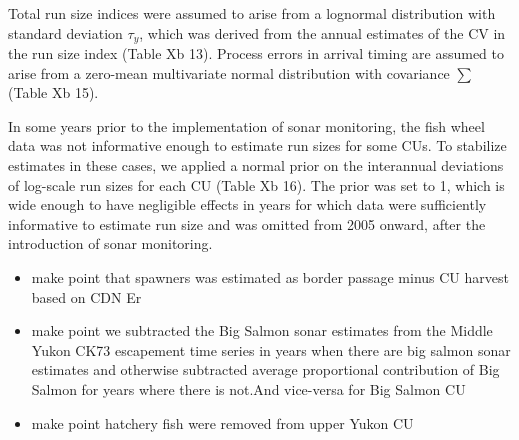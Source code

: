 \documentclass[11pt]{book}
\begin{document}
Total run size indices were assumed to arise from a lognormal distribution with standard deviation \(\tau_y\), which was derived from the annual estimates of the CV in the run size index (Table Xb 13). Process errors in arrival timing are assumed to arise from a zero-mean multivariate normal distribution with covariance \(\sum\) (Table Xb 15).

In some years prior to the implementation of sonar monitoring, the fish wheel data was not informative enough to estimate run sizes for some CUs. To stabilize estimates in these cases, we applied a normal prior on the interannual deviations of log-scale run sizes for each CU (Table Xb 16). The prior was set to 1, which is wide enough to have negligible effects in years for which data were sufficiently informative to estimate run size and was omitted from 2005 onward, after the introduction of sonar monitoring.

\hypertarget{model-fitting-and-diagnostics}{%
\label{model-fitting-and-diagnostics}}
\begin{itemize}

\item
  make point that spawners was estimated as border passage minus CU harvest based on CDN Er
\item
  make point we subtracted the Big Salmon sonar estimates from the Middle Yukon CK73 escapement time series in years when there are big salmon sonar estimates and otherwise subtracted average proportional contribution of Big Salmon for years where there is not.And vice-versa for Big Salmon CU
\item
  make point hatchery fish were removed from upper Yukon CU
\end{itemize}
\end{document}
